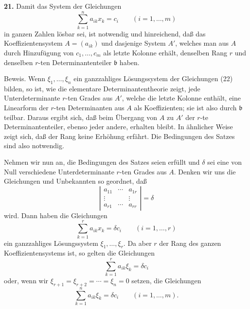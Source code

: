 \documentclass[11pt,a4paper]{article}
\begin{document}
\textbf{21.} Damit das System der Gleichungen
\[
 \sum_{k=1}^{n} a_{ik}x_k=c_i\qquad(i=1,\ldots,m) \tag{22}
\]
in ganzen Zahlen lösbar sei, ist notwendig und hinreichend, daß das Koeffizientensystem \(A=(a_{ik})\) und dasjenige System \(A'\), welches man aus \(A\) durch Hinzufügung von \(c_1,\ldots,c_m\) als letzte Kolonne erhält, denselben Rang \(r\) und denselben \(r\)-ten Determinantenteiler \(\mathfrak b\) haben.

Beweis. Wenn \(\xi_1,\ldots,\xi_n\) ein ganzzahliges Lösungssystem der Gleichungen (22) bilden, so ist, wie die elementare Determinantentheorie zeigt, jede Unterdeterminante \(r\)-ten Grades aus \(A'\), welche die letzte Kolonne enthält, eine Linearform der \(r\)-ten Determinanten aus \(A\) als Koeffizienten; sie ist also durch \(\mathfrak b\) teilbar. Daraus ergibt sich, daß beim Übergang von \(A\) zu \(A'\) der \(r\)-te Determinantenteiler, ebenso jeder andere, erhalten bleibt. In ähnlicher Weise zeigt sich, daß der Rang keine Erhöhung erfährt. Die Bedingungen des Satzes sind also notwendig.

Nehmen wir nun an, die Bedingungen des Satzes seien erfüllt und \(\delta\) sei eine von Null verschiedene Unterdeterminante \(r\)-ten Grades aus \(A\). Denken wir uns die Gleichungen und Unbekannten so geordnet, daß
\[
 \left|\begin{array}{ccc}
 a_{11}&\cdots&a_{1r}\\
 \vdots&&\vdots\\
 a_{r1}&\cdots&a_{rr}
 \end{array}\right|=\delta
\]
wird. Dann haben die Gleichungen
\[
 \sum_{k=1}^{r}a_{ik}x_k=\delta c_i \qquad(i=1,\ldots,r)
\]
ein ganzzahliges Lösungssystem \(\xi_1,\ldots,\xi_r\). Da aber \(r\) der Rang des ganzen Koeffizientensystems ist, so gelten die Gleichungen
\[
 \sum_{k=1}^{r}a_{ik}\xi_k=\delta c_i
\]
oder, wenn wir \(\xi_{r+1}=\xi_{r+2}=\cdots=\xi_n=0\) setzen, die Gleichungen
\[
 \sum_{k=1}^{n}a_{ik}\xi_k=\delta c_i\qquad(i=1,\ldots,m). \tag{23}
\]
\end{document}

